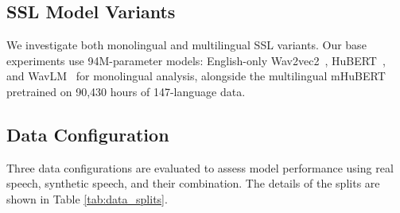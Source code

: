 \documentclass{Interspeech}
\begin{document}
\subsection{SSL Model Variants}
We investigate both monolingual and multilingual SSL variants. Our base experiments use 94M-parameter models: English-only Wav2vec2~\cite{wav2vec2}, HuBERT~\cite{hubert}, and WavLM~\cite{wavlm} for monolingual analysis, alongside the multilingual mHuBERT~\cite{mHuBERT} pretrained on 90,430 hours of 147-language data.

\subsection{Data Configuration}
Three data configurations are evaluated to assess model performance using real speech, synthetic speech, and their combination. The details of the splits are shown in Table \ref{tab:data_splits}.
\label{sec:datasets}
\end{document}
